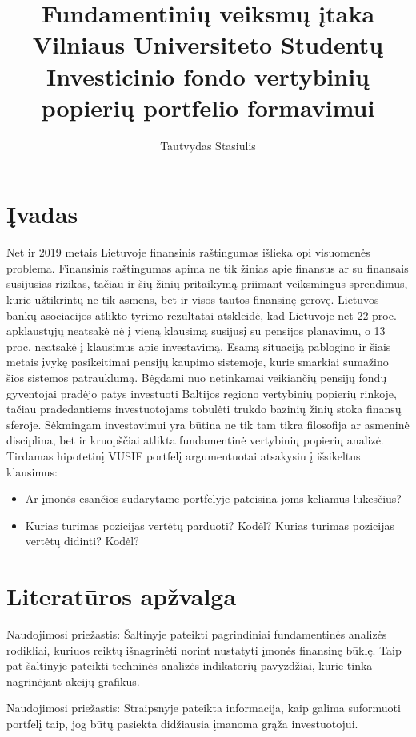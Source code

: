 \documentclass[titlepage, 11pt]{article}
\title{Fundamentinių veiksmų įtaka Vilniaus Universiteto Studentų Investicinio fondo vertybinių popierių portfelio formavimui}
\author{Tautvydas Stasiulis}
\begin{document}
\maketitle
\tableofcontents
\newpage
\section{Įvadas}

Net ir 2019 metais Lietuvoje finansinis raštingumas išlieka opi visuomenės problema. Finansinis raštingumas apima ne tik žinias apie finansus ar su finansais susijusias rizikas, tačiau ir šių žinių pritaikymą priimant veiksmingus sprendimus, kurie užtikrintų ne tik asmens, bet ir visos tautos finansinę gerovę. Lietuvos bankų asociacijos atlikto tyrimo rezultatai atskleidė, kad Lietuvoje net 22 proc. apklaustųjų neatsakė nė į vieną klausimą susijusį su pensijos planavimu, o 13 proc. neatsakė į klausimus apie investavimą. Esamą situaciją pablogino ir šiais metais įvykę pasikeitimai pensijų kaupimo sistemoje, kurie smarkiai sumažino šios sistemos patrauklumą. Bėgdami nuo netinkamai veikiančių pensijų fondų gyventojai pradėjo patys investuoti Baltijos regiono vertybinių popierių rinkoje, tačiau pradedantiems investuotojams tobulėti trukdo bazinių žinių stoka finansų sferoje. Sėkmingam investavimui yra būtina ne tik tam tikra filosofija ar asmeninė disciplina, bet ir kruopščiai atlikta fundamentinė vertybinių popierių analizė. Tirdamas hipotetinį VUSIF portfelį argumentuotai atsakysiu į išsikeltus klausimus:

\begin{itemize}
\item Ar įmonės esančios sudarytame portfelyje pateisina joms keliamus lūkesčius?
\item Kurias turimas pozicijas vertėtų parduoti? Kodėl? Kurias turimas pozicijas vertėtų didinti? Kodėl?
\end{itemize}

\cite{cibulskiene2006fundamentiniku}

\section{Literatūros apžvalga}
Naudojimosi priežastis: Šaltinyje pateikti pagrindiniai fundamentinės analizės rodikliai, kuriuos reiktų išnagrinėti norint nustatyti įmonės finansinę būklę. Taip pat šaltinyje pateikti techninės analizės indikatorių pavyzdžiai, kurie tinka nagrinėjant akcijų grafikus.

Naudojimosi priežastis: Straipsnyje pateikta informacija, kaip galima suformuoti portfelį taip, jog būtų pasiekta didžiausia įmanoma grąža investuotojui.
\end{document}
